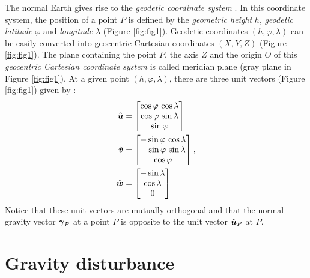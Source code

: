 \documentclass[extra]{gji}
\begin{document}
The normal Earth gives rise to the \textit{geodetic coordinate system}
\citep{heiskanen-moritz1967, soler1976, torge2012, bouman_etal2013}.
In this coordinate system, the position of a point $P$
is defined by the \textit{geometric height} $h$, 
\textit{geodetic latitude}
$\varphi$ and \textit{longitude} $\lambda$ (Figure \ref{fig:fig1}).
Geodetic coordinates $(h, \varphi, \lambda)$ can be easily 
converted into geocentric Cartesian coordinates $(X, Y, Z)$
(Figure \ref{fig:fig1}).
The plane containing the point $P$, the axis $Z$ and
the origin $O$ of this \textit{geocentric Cartesian coordinate system}
is called meridian plane (gray plane in Figure \ref{fig:fig1}).
At a given point $(h, \varphi, \lambda)$, there are three 
unit vectors (Figure \ref{fig:fig1}) given by \citep{soler1976}:
\begin{equation}
\begin{split}
\hat{\mitbf{u}} &= 
\begin{bmatrix}
\cos\varphi \, \cos\lambda \\
\cos\varphi \, \sin\lambda \\
\sin\varphi
\end{bmatrix} \\
\hat{\mitbf{v}} &= 
\begin{bmatrix}
-\sin\varphi \, \cos\lambda \\
-\sin\varphi \, \sin\lambda \\
\cos\varphi
\end{bmatrix} \\
\hat{\mitbf{w}} &= 
\begin{bmatrix}
-\sin\lambda \\
\cos\lambda \\
0
\end{bmatrix}
\end{split} \: ,
\label{eq:unit-vectors}
\end{equation}
Notice that these unit vectors are mutually orthogonal and
that the normal gravity vector $\mitbf{\gamma}_{P}$ at a point $P$
is opposite to the unit vector $\hat{\mitbf{u}}_{P}$ at $P$.


\section{Gravity disturbance}
\end{document}
